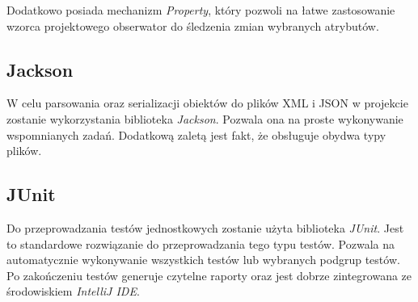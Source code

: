 \documentclass{report}
\begin{document}
Dodatkowo posiada mechanizm \textit{Property}, który pozwoli na łatwe zastosowanie wzorca projektowego obserwator do śledzenia zmian wybranych atrybutów.

\subsection{Jackson}
W celu parsowania oraz serializacji obiektów do plików XML i JSON w projekcie zostanie wykorzystania biblioteka \textit{Jackson}. Pozwala ona na proste wykonywanie wspomnianych zadań. Dodatkową zaletą jest fakt, że obsługuje obydwa typy plików.

\subsection{JUnit}
Do przeprowadzania testów jednostkowych zostanie użyta biblioteka \textit{JUnit}. Jest to standardowe rozwiązanie do przeprowadzania tego typu testów.
Pozwala na automatycznie wykonywanie wszystkich testów lub wybranych podgrup testów. Po zakończeniu testów generuje czytelne raporty oraz jest dobrze zintegrowana ze środowiskiem \textit{IntelliJ IDE}.
\end{document}
